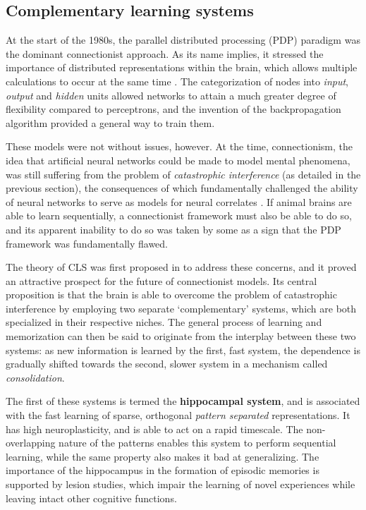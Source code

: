 \documentclass[11pt]{article}
\theoremstyle{remark}
\begin{document}
\subsection{Complementary learning systems}

At the start of the 1980s, the parallel distributed processing (PDP) paradigm was the dominant connectionist approach. As its name implies, it stressed the importance of distributed representations within the brain, which allows multiple calculations to occur at the same time \cite{rumelhart1986a}. The categorization of nodes into \textit{input}, \textit{output} and \textit{hidden} units allowed networks to attain a much greater degree of flexibility compared to perceptrons, and the invention of the backpropagation algorithm \cite{rumelhart1988learning} provided a general way to train them.

These models were not without issues, however. At the time, connectionism, the idea that artificial neural networks could be made to model mental phenomena, was still suffering from the problem of \textit{catastrophic interference} (as detailed in the previous section), the consequences of which fundamentally challenged the ability of neural networks to serve as models for neural correlates \cite{mccloskey1989catastrophic}. If animal brains are able to learn sequentially, a connectionist framework must also be able to do so, and its apparent inability to do so was taken by some as a sign that the PDP framework was fundamentally flawed.

The theory of CLS was first proposed in \cite{mcclelland1995why} to address these concerns, and it proved an attractive prospect for the future of connectionist models. Its central proposition is that the brain is able to overcome the problem of catastrophic interference by employing two separate `complementary' systems, which are both specialized in their respective niches. The general process of learning and memorization can then be said to originate from the interplay between these two systems: as new information is learned by the first, fast system, the dependence is gradually shifted towards the second, slower system in a mechanism called \textit{consolidation}.

The first of these systems is termed the \textbf{hippocampal system}, and is associated with the fast learning of sparse, orthogonal \textit{pattern separated} representations. It has high neuroplasticity, and is able to act on a rapid timescale. The non-overlapping nature of the patterns enables this system to perform sequential learning, while the same property also makes it bad at generalizing. The importance of the hippocampus in the formation of episodic memories is supported by lesion studies, which impair the learning of novel experiences while leaving intact other cognitive functions.
\end{document}
